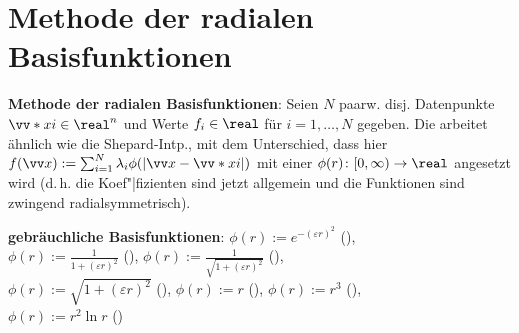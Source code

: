 \pagebreak

\section{%
    Methode der radialen Basisfunktionen%
}

\textbf{Methode der radialen Basisfunktionen}:
Seien $N$ paarw. disj. Datenpunkte $\vecs{x}{i} \in \real^n$ und Werte $f_i \in \real$
für $i = 1, \dotsc, N$ gegeben.
Die  arbeitet ähnlich wie die Shepard-Intp.,
mit dem Unterschied, dass hier $f(\vec{x}) := \sum_{i=1}^N \lambda_i \phi(|\vec{x} - \vecs{x}{i}|)$
mit einer  $\phi(r)\colon [0, \infty) \to \real$
angesetzt wird (d.\,h. die Koef"|fizienten sind jetzt allgemein und
die Funktionen sind zwingend radialsymmetrisch).

\textbf{gebräuchliche Basisfunktionen}:
$\phi(r) := e^{-(\varepsilon r)^2}$
(),\\
$\phi(r) := \frac{1}{1 + (\varepsilon r)^2}$
(),
$\phi(r) := \frac{1}{\sqrt{1 + (\varepsilon r)^2}}$
(),\\
$\phi(r) := \sqrt{1 + (\varepsilon r)^2}$
(),
$\phi(r) := r$
(),
$\phi(r) := r^3$
(),\\
$\phi(r) := r^2 \ln r$
()
%
%
%
%
%
%

